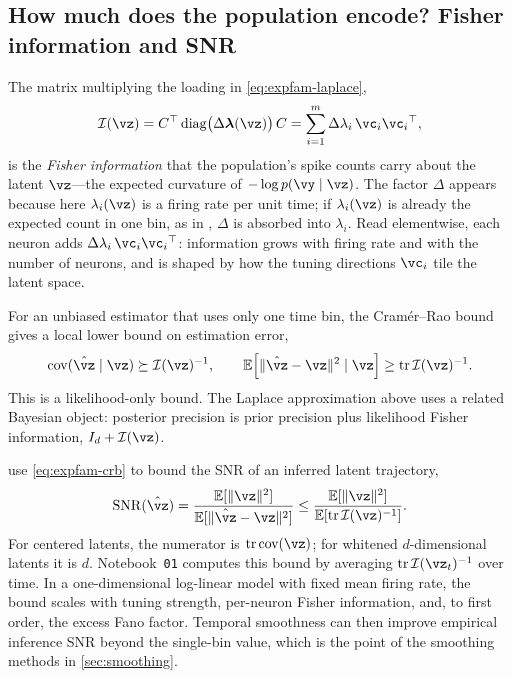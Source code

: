 \documentclass[11pt]{article}
\theoremstyle{plain}
\theoremstyle{definition}
\theoremstyle{remark}
\theoremstyle{definition}
\newcommand{\E}{\mathbb{E}}
\begin{document}
\subsection{How much does the population encode? Fisher information and SNR}

The matrix multiplying the loading in \eqref{eq:expfam-laplace},
\begin{equation}\label{eq:expfam-fisher}
    \mathcal{I}(\vz) = C\trp \diag\!\big(\Delta\bm{\lambda}(\vz)\big)\, C
                     = \sum_{i=1}^m \Delta\lambda_i\, \vc_i \vc_i\trp ,
\end{equation}
is the \emph{Fisher information} that the population's spike counts carry about
the latent $\vz$---the expected curvature of $-\log p(\vy\mid\vz)$. The factor
$\Delta$ appears because here $\lambda_i(\vz)$ is a firing rate per unit time; if
$\lambda_i(\vz)$ is already the expected count in one bin, as in
\textcite{Jeon2024b}, $\Delta$ is absorbed into $\lambda_i$. Read elementwise,
each neuron adds $\Delta\lambda_i\,\vc_i\vc_i\trp$: information grows with firing
rate and with the number of neurons, and is shaped by how the tuning directions
$\vc_i$ tile the latent space.

For an unbiased estimator that uses only one time bin, the Cram\'er--Rao bound
gives a local lower bound on estimation error,
\begin{equation}\label{eq:expfam-crb}
    \cov(\hat{\vz}\mid \vz) \succeq \mathcal{I}(\vz)^{-1}, \qquad
    \E\!\left[\|\hat{\vz}-\vz\|^2 \mid \vz\right]
        \ge \tr \mathcal{I}(\vz)^{-1}.
\end{equation}
This is a likelihood-only bound. The Laplace approximation above uses a related
Bayesian object: posterior precision is prior precision plus likelihood Fisher
information, $I_d+\mathcal{I}(\vz)$.

\textcite{Jeon2024b} use \eqref{eq:expfam-crb} to bound the SNR of an inferred
latent trajectory,
\begin{equation}\label{eq:expfam-snr}
    \mathrm{SNR}(\hat{\vz})
    =
    \frac{\E[\|\vz\|^2]}{\E[\|\hat{\vz}-\vz\|^2]}
    \le
    \frac{\E[\|\vz\|^2]}{\E\!\left[\tr \mathcal{I}(\vz)^{-1}\right]} .
\end{equation}
For centered latents, the numerator is $\tr\cov(\vz)$; for whitened
$d$-dimensional latents it is $d$. Notebook~\texttt{01} computes this bound by
averaging $\tr \mathcal{I}(\vz_t)^{-1}$ over time. In a one-dimensional
log-linear model with fixed mean firing rate, the bound scales with tuning
strength, per-neuron Fisher information, and, to first order, the excess Fano
factor. Temporal smoothness can then improve empirical inference SNR beyond the
single-bin value, which is the point of the smoothing methods in
\cref{sec:smoothing}.
\end{document}

